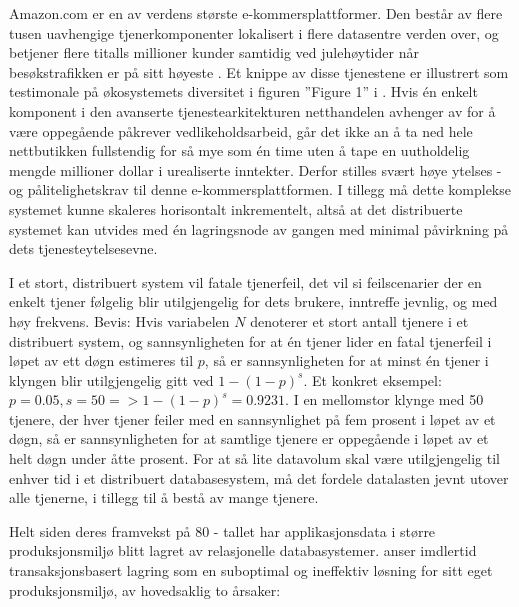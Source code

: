 Amazon.com er en av verdens største e-kommersplattformer. Den består av flere tusen uavhengige tjenerkomponenter lokalisert i flere datasentre verden over, og betjener flere titalls millioner kunder samtidig ved julehøytider når besøkstrafikken er på sitt høyeste \citep{pepitone2010}. Et knippe av disse tjenestene er illustrert som testimonale på økosystemets diversitet i figuren ''Figure 1'' i \citep{decandia2007}. Hvis én enkelt komponent i den avanserte tjenestearkitekturen netthandelen avhenger av for å være oppegående påkrever vedlikeholdsarbeid, går det ikke an å ta ned hele nettbutikken fullstendig for så mye som én time uten å tape en uutholdelig mengde millioner dollar i urealiserte inntekter. Derfor stilles svært høye ytelses - og pålitelighetskrav til denne e-kommersplattformen. I tillegg må dette komplekse systemet kunne skaleres horisontalt inkrementelt, altså at det distribuerte systemet kan utvides med én lagringsnode av gangen med minimal påvirkning på dets tjenesteytelsesevne.

I et stort, distribuert system vil fatale tjenerfeil, det vil si feilscenarier der en enkelt tjener følgelig blir utilgjengelig for dets brukere, inntreffe jevnlig, og med høy frekvens. Bevis: Hvis variabelen \(N\) denoterer et stort antall tjenere i et distribuert system, og sannsynligheten for at én tjener lider en fatal tjenerfeil i løpet av ett døgn estimeres til \(p\), så er sannsynligheten for at minst én tjener i klyngen blir utilgjengelig gitt ved \(1-(1-p)^s\). Et konkret eksempel: \(p=0.05, s=50 => 1-(1-p)^s=0.9231\). I en mellomstor klynge med 50 tjenere, der hver tjener feiler med en sannsynlighet på fem prosent i løpet av et døgn, så er sannsynligheten for at samtlige tjenere er oppegående i løpet av et helt døgn under åtte prosent. For at så lite datavolum skal være utilgjengelig til enhver tid i et distribuert databasesystem, må det fordele datalasten jevnt utover alle tjenerne, i tillegg til å bestå av mange tjenere.

Helt siden deres framvekst på 80 - tallet har applikasjonsdata i større produksjonsmiljø blitt lagret av relasjonelle databasystemer. \cite{decandia2007} anser imdlertid transaksjonsbasert lagring som en suboptimal og ineffektiv løsning for sitt eget produksjonsmiljø, av hovedsaklig to årsaker:

